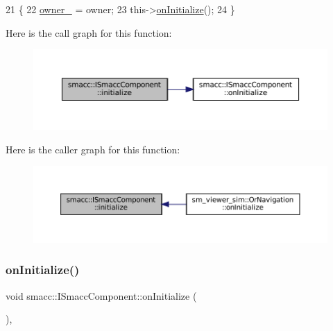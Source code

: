 \begin{DoxyCode}
21 \{
22     \hyperlink{classsmacc_1_1ISmaccComponent_a909590e672450ce0eb0d8facb45c737a}{owner\_} = owner;
23     this->\hyperlink{classsmacc_1_1ISmaccComponent_ae6f71d008db12553912e9436184b9e65}{onInitialize}();
24 \}
\end{DoxyCode}
Here is the call graph for this function\+:
\nopagebreak
\begin{figure}[H]
\begin{center}
\leavevmode
\includegraphics[width=350pt]{classsmacc_1_1ISmaccComponent_a3378552cb1a86aa26a07c0edc057448b_cgraph}
\end{center}
\end{figure}
Here is the caller graph for this function\+:
\nopagebreak
\begin{figure}[H]
\begin{center}
\leavevmode
\includegraphics[width=350pt]{classsmacc_1_1ISmaccComponent_a3378552cb1a86aa26a07c0edc057448b_icgraph}
\end{center}
\end{figure}
\mbox{\label{classsmacc_1_1ISmaccComponent_ae6f71d008db12553912e9436184b9e65}} 
\subsubsection{\texorpdfstring{on\+Initialize()}{onInitialize()}}
{\footnotesize\ttfamily void smacc\+::\+I\+Smacc\+Component\+::on\+Initialize (\begin{DoxyParamCaption}{ }\end{DoxyParamCaption})\hspace{0.3cm}{\ttfamily [protected]}, {\ttfamily [virtual]}}



